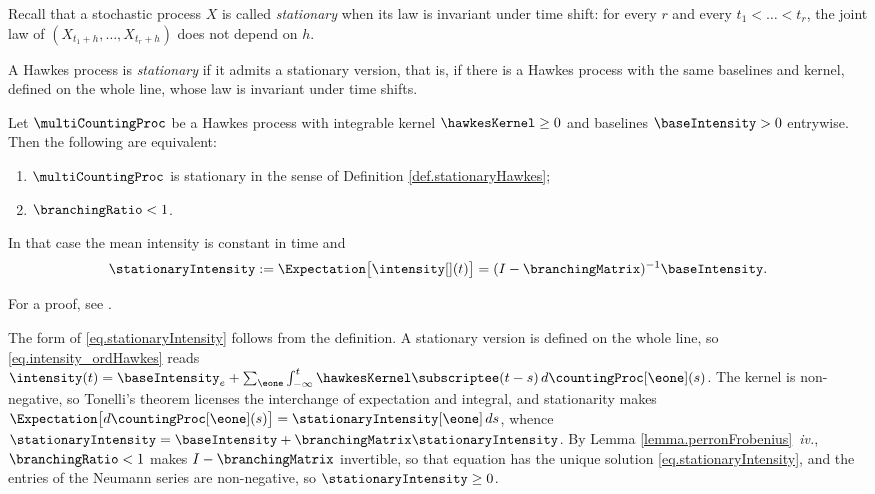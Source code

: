 Recall that
a stochastic process $X$ 
is called 
\emph{stationary} 
when its law is invariant under time shift:
for every $r$ and every $t_1 < \dots < t_r$,
the joint law of $(X_{t_1+h}, \dots, X_{t_r+h})$ does not depend on $h$.

\begin{defi}\label{def.stationaryHawkes}
 A Hawkes process is \emph{stationary} if it admits a stationary version,
 that is, if there is a Hawkes process with the same baselines and kernel,
 defined on the whole line,
 whose law is invariant under time shifts.
\end{defi}

\begin{thm}\label{thm.stationarity}
 Let $\multiCountingProc$ be a Hawkes process with integrable kernel
 $\hawkesKernel \geq 0$ and baselines $\baseIntensity > 0$ entrywise.
 Then the following are equivalent:
 \begin{enumerate}[label={\emph{\roman{*}}.}]
  \item $\multiCountingProc$ is stationary in the sense of
        Definition \ref{def.stationaryHawkes};
  \item $\branchingRatio < 1$.
 \end{enumerate}
 In that case the mean intensity is constant in time and
 \begin{equation}\label{eq.stationaryIntensity}
  \stationaryIntensity := \Expectation \big[ \intensity[ ](t) \big]
  = (I - \branchingMatrix)^{-1} \baseIntensity .
 \end{equation}
\end{thm}
For a proof, see \cite[Theorem 1]{BM96sta}.

The form of \eqref{eq.stationaryIntensity} follows from the definition.
A stationary version is defined on the whole line,
so \eqref{eq.intensity_ordHawkes} reads
$\intensity(t) = \baseIntensity_e + \sum_{\eone}\int_{-\infty}^{t}
\hawkesKernel\subscriptee(t-s)\,d\countingProc[\eone](s)$.
The kernel is non-negative, so Tonelli's theorem licenses the interchange of
expectation and integral, and stationarity makes
$\Expectation\big[d\countingProc[\eone](s)\big] = \stationaryIntensity[\eone]\,ds$,
whence
$\stationaryIntensity = \baseIntensity + \branchingMatrix\stationaryIntensity$.
By Lemma \ref{lemma.perronFrobenius}~\emph{iv.}, $\branchingRatio < 1$ makes
$I - \branchingMatrix$ invertible, so that equation has the unique solution
\eqref{eq.stationaryIntensity}, and the entries of the Neumann series are non-negative,
so $\stationaryIntensity \geq 0$.

